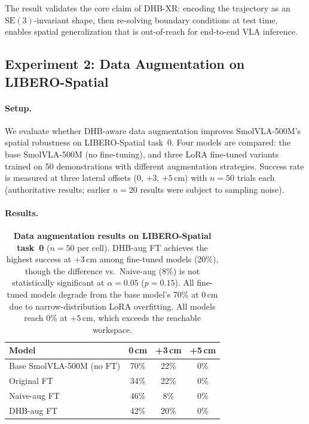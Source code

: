 \documentclass[11pt]{article}
\begin{document}
The result validates the core claim of DHB-XR: encoding the trajectory as an $\mathrm{SE}(3)$-invariant shape, then re-solving boundary conditions at test time, enables spatial generalization that is out-of-reach for end-to-end VLA inference.

\subsection{Experiment 2: Data Augmentation on LIBERO-Spatial}\label{sec:exp-augmentation}
\paragraph{Setup.}
We evaluate whether DHB-aware data augmentation improves SmolVLA-500M's spatial robustness on LIBERO-Spatial task~0. Four models are compared: the base SmolVLA-500M (no fine-tuning), and three LoRA fine-tuned variants trained on 50 demonstrations with different augmentation strategies. Success rate is measured at three lateral offsets ($0$, $+3$, $+5$\,cm) with $n=50$ trials each (authoritative results; earlier $n=20$ results were subject to sampling noise).

\paragraph{Results.}
\begin{table}[H]
  \centering
  \small
  \begin{tabular}{@{}lccc@{}}
    \toprule
    \textbf{Model} & \textbf{0\,cm} & \textbf{+3\,cm} & \textbf{+5\,cm} \\
    \midrule
    Base SmolVLA-500M (no FT) & 70\% & 22\% & 0\% \\
    Original FT              & 34\% & 22\% & 0\% \\
    Naive-aug FT             & 46\% &  8\% & 0\% \\
    DHB-aug FT               & 42\% & 20\% & 0\% \\
    \bottomrule
  \end{tabular}
  \caption{\textbf{Data augmentation results on LIBERO-Spatial task~0} ($n=50$ per cell). DHB-aug FT achieves the highest success at $+3$\,cm among fine-tuned models (20\%), though the difference vs.\ Naive-aug (8\%) is not statistically significant at $\alpha=0.05$ ($p=0.15$). All fine-tuned models degrade from the base model's 70\% at 0\,cm due to narrow-distribution LoRA overfitting. All models reach 0\% at $+5$\,cm, which exceeds the reachable workspace.}
  \label{tab:augmentation}
\end{table}
\end{document}
